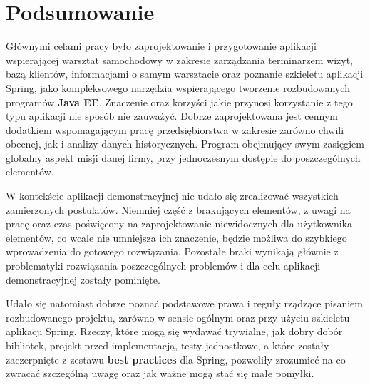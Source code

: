 \chapter{Podsumowanie}
\label{chapter:summary}
	Głównymi celami pracy było zaprojektowanie i przygotowanie aplikacji wspierającej warsztat samochodowy w zakresie
	zarządzania terminarzem wizyt, bazą klientów, informacjami o samym warsztacie oraz poznanie szkieletu aplikacji
	Spring, jako kompleksowego narzędzia wspierającego tworzenie rozbudowanych programów \textbf{Java EE}. 
	Znaczenie oraz korzyści jakie przynosi korzystanie z tego typu aplikacji nie sposób nie zauważyć. Dobrze zaprojektowana
	jest cennym dodatkiem wspomagającym pracę przedsiębiorstwa w zakresie zarówno chwili obecnej, jak i analizy danych historycznych.
	Program obejmujący swym zasięgiem globalny aspekt misji danej firmy, przy jednoczesnym dostępie do poszczególnych elementów. 
	
	W kontekście aplikacji demonstracyjnej nie udało się zrealizować wszystkich zamierzonych postulatów. Niemniej część z brakujących
	elementów, z uwagi na pracę oraz czas poświęcony na zaprojektowanie niewidocznych dla użytkownika elementów, co wcale nie umniejsza
	ich znaczenie, będzie możliwa do szybkiego wprowadzenia do gotowego rozwiązania. Pozostałe braki wynikają głównie z problematyki
	rozwiązania poszczególnych problemów i dla celu aplikacji demonstracyjnej zostały pominięte.
	
	Udało się natomiast dobrze poznać podstawowe prawa i reguły rządzące pisaniem rozbudowanego projektu, zarówno w sensie ogólnym
	oraz przy użyciu szkieletu aplikacji Spring. Rzeczy, które mogą się wydawać trywialne, jak dobry dobór bibliotek, projekt przed implementacją,
	testy jednostkowe, a które zostały zaczerpnięte z zestawu \textbf{best practices} dla Spring, pozwoliły zrozumieć na co zwracać szczególną
	uwagę oraz jak ważne mogą stać się małe pomyłki. 